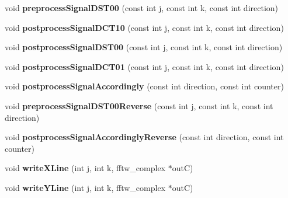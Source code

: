 \begin{DoxyCompactItemize}
\item 
\hypertarget{classFourier_a98376fa128963eb4f2b233d5df181a0a}{void {\bfseries preprocess\-Signal\-D\-S\-T00} (const int j, const int k, const int direction)}\label{classFourier_a98376fa128963eb4f2b233d5df181a0a}

\item 
\hypertarget{classFourier_a007e9dae4561b8a0691965350586a274}{void {\bfseries postprocess\-Signal\-D\-C\-T10} (const int j, const int k, const int direction)}\label{classFourier_a007e9dae4561b8a0691965350586a274}

\item 
\hypertarget{classFourier_a39a4fb3d8b9f123eba8aa4817b103e81}{void {\bfseries postprocess\-Signal\-D\-S\-T00} (const int j, const int k, const int direction)}\label{classFourier_a39a4fb3d8b9f123eba8aa4817b103e81}

\item 
\hypertarget{classFourier_ab93d1bb7f9e6782e4da50064cd40d848}{void {\bfseries postprocess\-Signal\-D\-C\-T01} (const int j, const int k, const int direction)}\label{classFourier_ab93d1bb7f9e6782e4da50064cd40d848}

\item 
\hypertarget{classFourier_ac798a8bd3f9a7bacaa4704374aa38072}{void {\bfseries postprocess\-Signal\-Accordingly} (const int direction, const int counter)}\label{classFourier_ac798a8bd3f9a7bacaa4704374aa38072}

\item 
\hypertarget{classFourier_a3a87d5183bb42fc4b741579965e221ca}{void {\bfseries preprocess\-Signal\-D\-S\-T00\-Reverse} (const int j, const int k, const int direction)}\label{classFourier_a3a87d5183bb42fc4b741579965e221ca}

\item 
\hypertarget{classFourier_a0fd0f5871c9743c89b12a6923f9104a5}{void {\bfseries postprocess\-Signal\-Accordingly\-Reverse} (const int direction, const int counter)}\label{classFourier_a0fd0f5871c9743c89b12a6923f9104a5}

\item 
\hypertarget{classFourier_a49c1837b58491442977d029ce9d57748}{void {\bfseries write\-X\-Line} (int j, int k, fftw\-\_\-complex $\ast$out\-C)}\label{classFourier_a49c1837b58491442977d029ce9d57748}

\item 
\hypertarget{classFourier_a41301dd8e1444c5b7608667255ba9013}{void {\bfseries write\-Y\-Line} (int j, int k, fftw\-\_\-complex $\ast$out\-C)}\label{classFourier_a41301dd8e1444c5b7608667255ba9013}


\end{DoxyCompactItemize}
